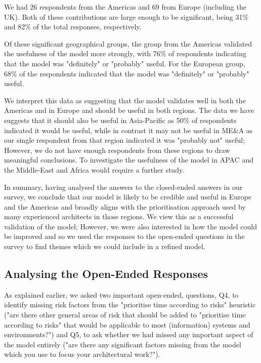 We had 26 respondents from the Americas and 69 from Europe (including the UK).  Both of these contributions are large enough to be significant, being 31\% and 82\% of the total responses, respectively.

Of these significant geographical groups, the group from the Americas validated the usefulness of the model more strongly, with 76\% of respondents indicating that the model was "definitely" or "probably" useful.  For the European group, 68\% of the respondents indicated that the model was "definitely" or "probably" useful.

We interpret this data as suggesting that the model validates well in both the Americas and in Europe and should be useful in both regions.  The data we have suggests that it should also be useful in Asia-Pacific as 50\% of respondents indicated it would be useful, while in contrast it may not be useful in ME\&A as our single respondent from that region indicated it was "probably not" useful; However, we do not have enough respondents from these regions to draw meaningful conclusions.  To investigate the usefulness of the model in APAC and the Middle-East and Africa would require a further study.

In summary, having analysed the answers to the closed-ended answers in our survey, we conclude that our model is likely to be credible and useful in Europe and the Americas and broadly aligns with the prioritisation approach used by many experienced architects in those regions.
We view this as a successful validation of the model; However, we were also interested in how the model could be improved and so we used the responses to the open-ended questions in the survey to find themes which we could include in a refined model.

\subsection{Analysing the Open-Ended Responses}
\label{sec:openended}

As explained earlier, we asked two important open-ended, questions, Q4, to identify missing risk factors from the "prioritise time according to risks" heuristic ("are there other general areas of risk that should be added to "prioritise time according to risks" that would be applicable to most (information) systems and environments?") and Q5, to ask whether we had missed any important aspect of the model entirely ("are there any significant factors missing from the model which you use to focus your architectural work?").

